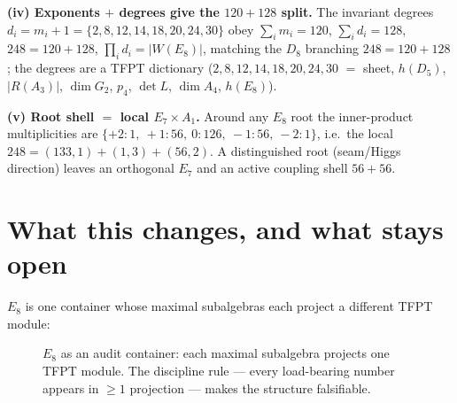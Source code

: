 \documentclass[11pt,a4paper]{article}
\theoremstyle{definition}
\begin{document}
\par\smallskip\noindent\textbf{(iv) Exponents $+$ degrees give the $120{+}128$ split.}
The invariant degrees $d_i=m_i+1=\{2,8,12,14,18,20,24,30\}$ obey
$\sum_i m_i=120$, $\sum_i d_i=128$, $248=120+128$, $\prod_i d_i=|W(E_8)|$,
matching the $D_8$ branching $248=120+128$; the degrees are a TFPT dictionary
($2,8,12,14,18,20,24,30$ $=$ sheet, $h(D_5)$, $|R(A_3)|$, $\dim G_2$, $p_4$, $\det L$, $\dim A_4$, $h(E_8)$). \mE

\par\smallskip\noindent\textbf{(v) Root shell $=$ local $E_7\times A_1$.}
Around any $E_8$ root the inner-product multiplicities are
$\{+2{:}1,\ +1{:}56,\ 0{:}126,\ -1{:}56,\ -2{:}1\}$, i.e.\ the local
$248=(133,1){+}(1,3){+}(56,2)$. A distinguished root (seam/Higgs direction) leaves an orthogonal $E_7$
and an active coupling shell $56{+}56$. \mE

\section{What this changes, and what stays open}
$E_8$ is one container whose maximal subalgebras each project a different TFPT module:

\begin{figure}[h]\centering
{}
\caption{\small $E_8$ as an audit container: each maximal subalgebra projects one TFPT module. The
discipline rule --- every load-bearing number appears in $\ge1$ projection --- makes the structure
falsifiable.}
\end{figure}
\end{document}
